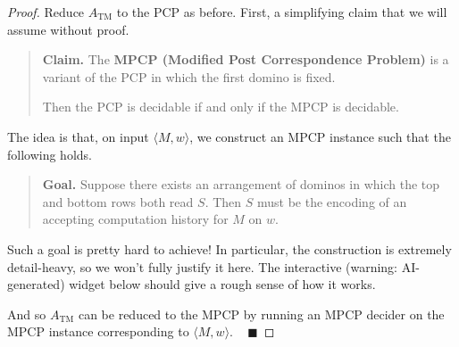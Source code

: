 \begin{proof}
    Reduce $A_{\mathrm{TM}}$ to the PCP as before.
    First, a simplifying claim that we will assume without proof.

    \begin{quote}
        \textbf{Claim.}
        The \textbf{MPCP (Modified Post Correspondence Problem)}
        is a variant of the PCP in which the first domino is fixed.

        Then the PCP is decidable if and only if the MPCP is decidable.
    \end{quote}

    The idea is that, on input $\langle M, w \rangle$,
    we construct an MPCP instance such that
    the following holds.
    
    \begin{quote}
        \textbf{Goal.}
        Suppose there exists an arrangement of dominos
        in which the top and bottom rows both read $S$.
        Then $S$ must be the encoding of an accepting computation history
        for $M$ on $w$.
    \end{quote}

    Such a goal is pretty hard to achieve!
    In particular, the construction is extremely detail-heavy,
    so we won't fully justify it here.
    The interactive (warning: AI-generated) widget below
    should give a rough sense of how it works.


    And so $A_{\mathrm{TM}}$ can be reduced to the MPCP
    by running an MPCP decider on
    the MPCP instance corresponding to $\langle M, w \rangle$.
    ~ $\blacksquare$
\end{proof}


